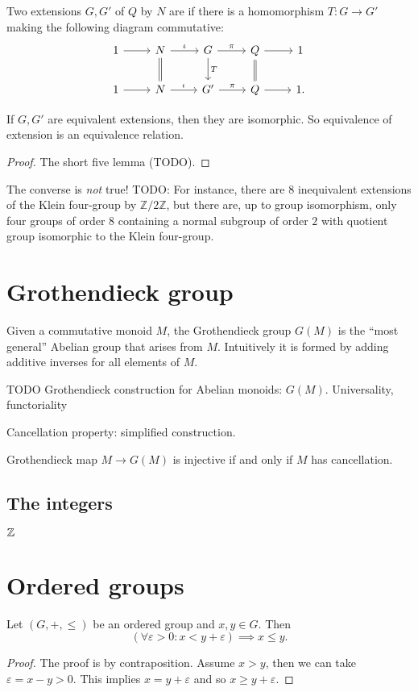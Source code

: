 \begin{definition}
Two extensions $G,G'$ of $Q$ by $N$ are  if there is a homomorphism $T:G\to G'$ making the following diagram commutative:
\[
\begin{tikzcd}
1 \ar[r] & N \ar[r, "\iota"] \ar[equal]{d} & G \ar[r, "\pi"] \ar[d,"T"] & Q \ar[r] \ar[d, equal] & 1 \\
1 \ar[r] & N \ar[r, "\iota"] & G' \ar[r, "\pi"] & Q \ar[r] & 1.
\end{tikzcd}
\]
\end{definition}
\begin{lemma}
If $G,G'$ are equivalent extensions, then they are isomorphic. So equivalence of extension is an equivalence relation.
\end{lemma}
\begin{proof}
The short five lemma (TODO).
\end{proof}
The converse is \emph{not} true! TODO: For instance, there are $8$ inequivalent extensions of the Klein four-group by $\mathbb{Z}/2\mathbb{Z}$, but there are, up to group isomorphism, only four groups of order $8$ containing a normal subgroup of order $2$ with quotient group isomorphic to the Klein four-group.

\section{Grothendieck group}
Given a commutative monoid $M$, the Grothendieck group $G(M)$ is the ``most general'' Abelian group that arises from $M$. Intuitively it is formed by adding additive inverses for all elements of $M$.



 
TODO Grothendieck construction for Abelian monoids: $G(M)$.
Universality, functoriality

Cancellation property: simplified construction.

Grothendieck map $M\to G(M)$ is injective \textup{if and only if} $M$ has cancellation.

\subsection{The integers}
\begin{definition}
$\mathbb{Z}$
\end{definition}


\section{Ordered groups}

\begin{lemma}
Let $(G,+,\leq)$ be an ordered group and $x,y\in G$. Then
\[ (\forall \varepsilon > 0: x< y+\varepsilon) \implies x\leq y. \]
\end{lemma}
\begin{proof}
The proof is by contraposition. Assume $x>y$, then we can take $\varepsilon = x-y>0$. This implies $x = y+\varepsilon$ and so $x \geq y+\varepsilon$. 
\end{proof}
